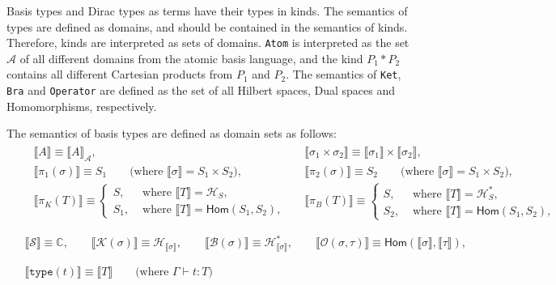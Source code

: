 \documentclass[manuscript, review, timestamp]{acmart}
\newcommand*{\Sc}{\mathcal{S}}
\newcommand*{\K}{\mathcal{K}}
\newcommand*{\B}{\mathcal{B}}
\newcommand*{\Op}{\mathcal{O}}
\newcommand*{\sem}[1]{\llbracket #1 \rrbracket}
\begin{document}
Basis types and Dirac types as terms have their types in kinds. The semantics of types are defined as domains, and should be contained in the semantics of kinds. Therefore, kinds are interpreted as sets of domains. \texttt{Atom} is interpreted as the set $\mathcal{A}$ of all different domains from the atomic basis language, and the kind $P_1 * P_2$ contains all different Cartesian products from $P_1$ and $P_2$. The semantics of \texttt{Ket}, \texttt{Bra} and \texttt{Operator} are defined as the set of all Hilbert spaces, Dual spaces and Homomorphisms, respectively.


\begin{definition}
  The semantics of basis types are defined as domain sets as follows:
  \begin{align*}
    & \begin{aligned}
      & \sem{A} \equiv \sem{A}_\mathcal{A},
      \qquad
      && \sem{\sigma_1 \times \sigma_2} \equiv \sem{\sigma_1} \times \sem{\sigma_2}, \\
      & \sem{\pi_1(\sigma)} \equiv S_1 \qquad \text{(where $\sem{\sigma} = S_1 \times S_2$)},
      && \sem{\pi_2(\sigma)} \equiv S_2 \qquad \text{(where $\sem{\sigma} = S_1 \times S_2$)}, \\
      & \sem{\pi_K(T)} \equiv \left\{
        \begin{array}{ll}
          S, & \text{ where } \sem{T} = \mathcal{H}_S, \\
          S_1, & \text{ where } \sem{T} = \textsf{Hom}(S_1, S_2),
        \end{array}
      \right.
      && \sem{\pi_B(T)} \equiv \left\{
        \begin{array}{ll}
          S, & \text{ where } \sem{T} = \mathcal{H}^*_S, \\
          S_2, & \text{ where } \sem{T} = \textsf{Hom}(S_1, S_2),
        \end{array}
      \right.
    \end{aligned} \\
    \\
    & \begin{aligned}
      \sem{\Sc} \equiv \mathbb{C},
      \qquad
      \sem{\K(\sigma)} \equiv \mathcal{H}_{\sem{\sigma}}, 
      \qquad 
      \sem{\B(\sigma)} \equiv \mathcal{H}^*_{\sem{\sigma}},
      \qquad
      \sem{\Op(\sigma, \tau)} \equiv \textsf{Hom}(\sem{\sigma}, \sem{\tau}),
    \end{aligned} \\
    \\
    & \begin{aligned}
      \sem{\texttt{type}(t)} \equiv \sem{T} \qquad \text{(where $\Gamma \vdash t : T$)}
    \end{aligned}
  \end{align*}
\end{definition}
\end{document}
